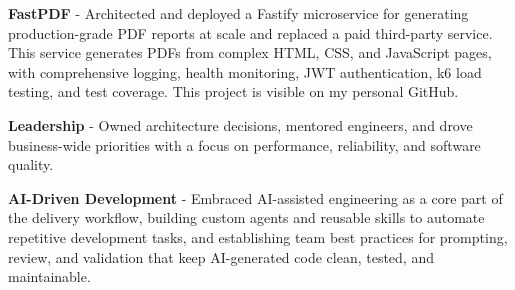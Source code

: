 \begin{cventries}
{\begin{cvsubitems}
            \item {\textbf{FastPDF} - Architected and deployed a Fastify microservice for generating production-grade PDF reports at scale and replaced a paid third-party service.  This service generates PDFs from complex HTML, CSS, and JavaScript pages, with comprehensive logging, health monitoring, JWT authentication, k6 load testing, and test coverage. This project is visible on my personal GitHub.}
        \end{cvsubitems}
        \begin{cvitems}
            \item {\textbf{Leadership} - Owned architecture decisions, mentored engineers, and drove business-wide priorities with a focus on performance, reliability, and software quality.}
            \item {\textbf{AI-Driven Development} - Embraced AI-assisted engineering as a core part of the delivery workflow, building custom agents and reusable skills to automate repetitive development tasks, and establishing team best practices for prompting, review, and validation that keep AI-generated code clean, tested, and maintainable.}
        \end{cvitems}
    }
\end{cventries}
